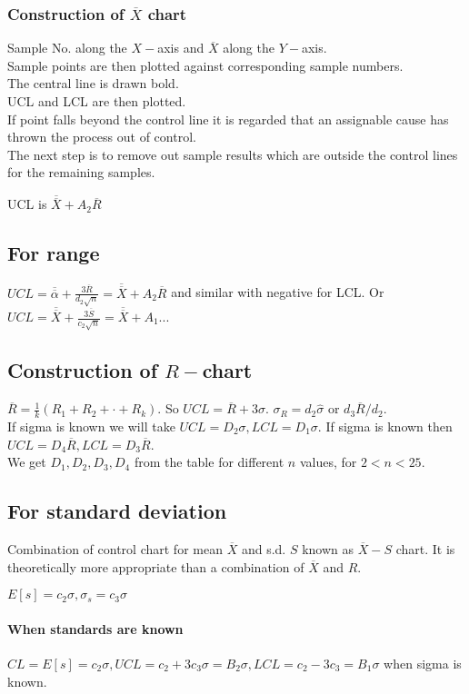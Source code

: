 \documentclass[oneside,11pt,pdftex]{book}%
\numberwithin{equation}{section}
\numberwithin{section}{chapter}
\numberwithin{equation}{chapter}
\begin{document}
\subsubsection{Construction of $ \overline{X} $ chart} 
Sample No. along the $ X- $axis and $ \overline{X} $ along the $ Y- $axis.\\
Sample points are then plotted against corresponding sample numbers.\\
The central line is drawn bold.\\
UCL and LCL are then plotted.\\
If point falls beyond the control line it is regarded that an assignable cause has thrown the process out of control.\\
The next step is to remove out sample results which are outside the control lines for the remaining samples.

UCL is $ \overline{\overline{X}}+A_2 \overline{R} $
\subsection{For range}
$ UCL=\overline{\overline{\alpha}}+\frac{3\overline{R}}{d_2 \sqrt{n}} =\overline{\overline{X}}+A_2 \overline{R}$ and similar with negative for LCL. 
Or $ UCL=\overline{\overline{X}} +\frac{3 \overline{S}}{c_2 \sqrt{n}}=\overline{\overline{X}}+A_1...$

\subsection{Construction of $ R- $chart}
$ \overline{R} =\frac{1}{k}(R_1+R_2+\cdot+R_k)$. So $ UCL=\overline{R} + 3 \sigma$. $ \sigma_R=d_2\hat{\sigma }$ or $ d_3 \overline{R} /d_2 $.\\
If sigma is known we will take $ UCL=D_2 \sigma, LCL=D_1 \sigma  $. If sigma is known then $ UCL=D_4\overline{R}, LCL= D_3 \overline{R}$.\\
We get $ D_1,D_2,D_3,D_4  $ from the table for different $ n $ values, for $ 2<n<25 $.
\subsection{For standard deviation}
Combination of control chart for mean $ \overline{X} $ and s.d. $ S $ known as $ \overline{X} -S$ chart. It is theoretically more appropriate than a combination of $ \overline{X}$ and $ R $.

$ E[s]=c_2 \sigma, \sigma_s=c_3 \sigma	$

\paragraph{When standards are known}
$ CL=E[s]=c_2\sigma, UCL=c_2+3c_3 \sigma =B_2 \sigma, LCL=c_2-3c_3=B_1 \sigma $ when sigma is known. 
\end{document}
